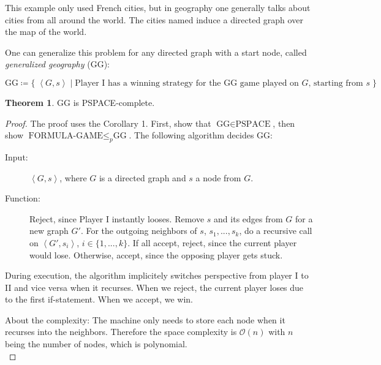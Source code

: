 \documentclass[10pt,fleqn]{article}
\theoremstyle{definition}
\newtheorem{theorem}{Theorem}
\theoremstyle{remark}
\newcommand{\pspaceclass}{\text{PSPACE}}
\newcommand{\formulagameprob}{\text{FORMULA-GAME}}
\newcommand{\ggprob}{\text{GG}}
\newcommand{\lpp}{\left \langle}
\newcommand{\rpp}{\right \rangle}
\newcommand{\enc}[1]{\lpp #1 \rpp}
\begin{document}
This example only used French cities, but in geography one generally talks about cities from all around the world. The cities named induce a directed graph over the map of the world.

One can generalize this problem for any directed graph with a start node, called \emph{generalized geography} (GG):
\begin{ceqn}
    \[
        \ggprob \coloneqq \{\; \enc{G, s} \mid \text{Player I has a winning strategy for the GG game played on }G\text{, starting from } s \;\}
    \]
\end{ceqn}

\begin{theorem}
    \(\ggprob\) is PSPACE-complete.
\end{theorem}
\begin{proof}
    The proof uses the Corollary 1. First, show that \(\ggprob \in \pspaceclass\), then show \(\formulagameprob \leq_p \ggprob\). The following algorithm decides GG:
    \begin{description}
        \item[Input:] \(\enc{G, s}\), where \(G\) is a directed graph and \(s\) a node from \(G\).
        \item[Function:] \phantom{}
            \begin{algorithmic}[1]
                    \State Reject, since Player I instantly looses.
                \EndIf
                \State Remove \(s\) and its edges from \(G\) for a new graph \(G'\).
                \State For the outgoing neighbors of \(s\), \(s_1, ..., s_k\), do a recursive call on \(\enc{G', s_i}\), \(i \in \{1,...,k\}\).
                \State If all accept, reject, since the current player would lose. Otherwise, accept, since the opposing player gets stuck.
            \end{algorithmic}
    \end{description}
    During execution, the algorithm implicitely switches perspective from player I to II and vice versa when it recurses. When we reject, the current player loses due to the first if-statement. When we accept, we win.
    
    About the complexity: The machine only needs to store each node when it recurses into the neighbors. Therefore the space complexity is \(\mathcal{O}(n)\) with \(n\) being the number of nodes, which is polynomial.\\


\end{proof}
\end{document}
